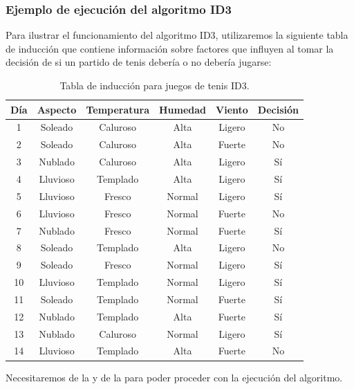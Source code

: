 \newpage
\subsubsection{Ejemplo de ejecución del algoritmo ID3} \label{ejecucionID3}

Para ilustrar el funcionamiento del algoritmo ID3, utilizaremos la siguiente tabla de inducción que contiene información sobre factores que influyen al tomar la decisión de si un partido de tenis debería o no debería jugarse:

\begin{table}[!hb]
	\begin{center}
		\label{tab:tablaInduccionID3}
		\begin{tabular}{c|c|c|c|c|c}
			\textbf{Día} & \textbf{Aspecto} & \textbf{Temperatura} & \textbf{Humedad} & \textbf{Viento} & \textbf{Decisión}\\
			\hline
			1 & Soleado & Caluroso & Alta & Ligero & No\\
			2 & Soleado & Caluroso & Alta & Fuerte & No\\
			3 & Nublado & Caluroso & Alta & Ligero & Sí\\
			4 & Lluvioso & Templado & Alta & Ligero & Sí\\
			5 & Lluvioso & Fresco & Normal & Ligero & Sí\\
			6 & Lluvioso & Fresco & Normal & Fuerte & No\\
			7 & Nublado & Fresco & Normal & Fuerte & Sí\\
			8 & Soleado & Templado & Alta & Ligero & No\\
			9 & Soleado & Fresco & Normal & Ligero & Sí\\
			10 & Lluvioso & Templado & Normal & Ligero & Sí\\
			11 & Soleado & Templado & Normal & Fuerte & Sí\\
			12 & Nublado & Templado & Alta & Fuerte & Sí\\
			13 & Nublado & Caluroso & Normal & Ligero & Sí\\
			14 & Lluvioso & Templado & Alta & Fuerte & No\\
		\end{tabular}
	\end{center}
	\caption{Tabla de inducción para juegos de tenis ID3.}
\end{table}

Necesitaremos de la  y de la  para poder proceder con la ejecución del algoritmo.\\

